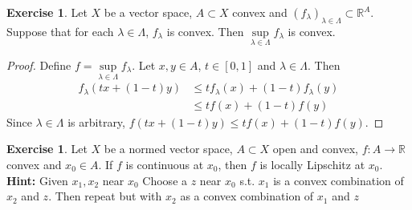 \documentclass[12pt]{amsart}
\theoremstyle{definition}
\theoremstyle{remark}
\theoremstyle{definition}
\newtheorem{ex}[definition]{Exercise}
\newcommand{\lam}{\lambda}
\newcommand{\Lam}{\Lambda}
\newcommand{\R}{\mathbb{R}}
\begin{document}
	\begin{ex}
	Let $X$ be a vector space, $A \subset X$ convex and $ (f_{\lam})_{\lam \in \Lam} \subset \R^A$. Suppose that for each $\lam \in \Lam$, $f_\lam$ is convex. Then $\sup\limits_{\lam \in \Lam}f_\lam$ is convex.
	\end{ex}
	
	\begin{proof}
	Define $f = \sup\limits_{\lam \in \Lam} f_{\lam}$. Let $x, y \in A$, $t \in [0,1]$ and $\lam \in \Lam$. Then \begin{align*}
	f_\lam(tx + (1-t)y) 
	&\leq tf_\lam (x) + (1-t)f_\lam(y) \\
	& \leq tf(x) + (1-t)f(y) 
\end{align*}	
	Since $\lam \in \Lam$ is arbitrary, $f(tx + (1-t)y) \leq tf(x) + (1-t)f(y) $. 
	\end{proof}
	
	\begin{ex}
	Let $X$ be a normed vector space, $A \subset X$ open and convex, $f:A \rightarrow \R$ convex and $x_0 \in A$. If $f$ is continuous at $x_0$, then $f$ is locally Lipschitz at $x_0$. \\
	\textbf{Hint:} Given $x_1, x_2$ near $x_0$ Choose a $z$ near $x_0$ s.t. $x_1$ is a convex combination of $x_2$ and $z$. Then repeat but with $x_2$ as a convex combination of $x_1$ and $z$
	\end{ex}
	
\end{document}
